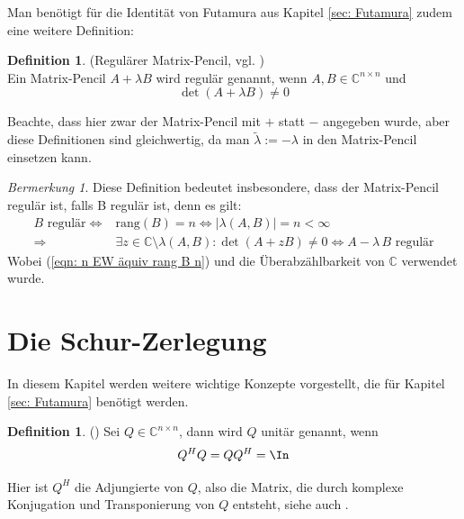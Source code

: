 \documentclass[a4paper,12pt]{report}
\newcommand{\C}{\mathbb C}
\newcommand{\rang}{\text{rang}}
\newcommand{\AlamB}{A-\lambda\,B}
\newcommand{\Cnn}{\C^{n\times n}}
\newcommand{\1}{\mathds{1}}
\theoremstyle{plain} %
\theoremstyle{definition} %
\newtheorem{definition}[theorem]{Definition}
\theoremstyle{remark}
\newtheorem{remark}[theorem]{Bermerkung}
\begin{document}
            Man benötigt für die Identität von Futamura aus Kapitel \ref{sec: Futamura} zudem eine weitere Definition:
            \begin{definition}(Regulärer Matrix-Pencil, vgl. \cite[S. 784]{regularMatrixPencil})\\
                  \label{def: regulärer Pencil}
                  Ein Matrix-Pencil $A+\lambda B$ wird regulär genannt, wenn $A,B\in \Cnn$ und
                  $$\det(A+\lambda B)\ne 0$$ 
            \end{definition}

            Beachte, dass hier zwar der Matrix-Pencil mit $+$ statt $-$ angegeben wurde, aber diese Definitionen sind gleichwertig, da man $\tilde \lambda := -\lambda$ in den Matrix-Pencil einsetzen kann.
            \begin{remark}
                  \label{bem: B reg impl pencil reg}
                  Diese Definition bedeutet insbesondere, dass der Matrix-Pencil regulär ist, falls B regulär ist, denn es gilt:
                  \begin{align*}
                        B\text{ regulär} \Leftrightarrow & \rang(B)=n\Leftrightarrow |\lambda(A,B)| = n<\infty\\
                        \Rightarrow & \exists z\in\C\setminus\lambda(A,B): \det(A+zB) \ne 0 \Leftrightarrow \AlamB \text{ regulär}
                  \end{align*}
                  Wobei (\ref{eqn: n EW äquiv rang B n}) und die Überabzählbarkeit von $\C$ verwendet wurde.
            \end{remark}
            

      \section{Die Schur-Zerlegung}
            In diesem Kapitel werden weitere wichtige Konzepte vorgestellt, die für Kapitel \ref{sec: Futamura} benötigt werden.

            \begin{definition}(\cite[S. 73]{matrixGolub})
                  Sei $Q \in\C^{n\times n}$, dann wird $Q$ unitär genannt, wenn
                  $$Q^HQ = QQ^H=\In$$
            \end{definition}

            Hier ist $Q^H$ die Adjungierte von $Q$, also die Matrix, die durch komplexe Konjugation und Transponierung von $Q$ entsteht, siehe auch \cite[S. 14]{matrixGolub}.
\end{document}
